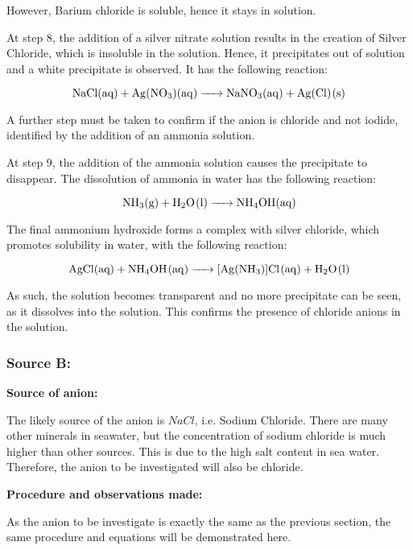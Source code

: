 \documentclass[11pt, a4]{article}
\begin{document}
					However, Barium chloride is soluble, hence it stays in solution. 

					At step 8, the addition of a silver nitrate solution results in the creation of Silver Chloride, which is insoluble in the solution. Hence, it precipitates out of solution and a white precipitate is observed. It has the following reaction:

					\begin{equation}
						\ce{NaCl{(aq)} + Ag(NO_3)(aq) -> NaNO3(aq) + Ag(Cl)(s)}
					\end{equation}

					A further step must be taken to confirm if the anion is chloride and not iodide, identified by the addition of an ammonia solution.
					
					At step 9, the addition of the ammonia solution causes the precipitate to disappear. The dissolution of ammonia in water has the following reaction:

					\begin{equation}
						\ce{NH_3{(g)} + H_2O(l) -> NH_4OH{(aq)}}
					\end{equation}

					The final ammonium hydroxide forms a complex with silver chloride, which promotes solubility in water, with the following reaction:

					\begin{equation}
						\ce{AgCl{(aq)} + NH_4OH(aq) -> [Ag(NH_3)]Cl(aq) + H_2O(l)}
					\end{equation}
					
					As such, the solution becomes transparent and no more precipitate can be seen, as it dissolves into the solution. This confirms the presence of chloride anions in the solution.


				\subsubsection{Source B:}

				\textbf{Source of anion:}

					The likely source of the anion is $NaCl$, i.e. Sodium Chloride. There are many other minerals in seawater, but the concentration of sodium chloride is much higher than other sources. This is due to the high salt content in sea water. Therefore, the anion to be investigated will also be chloride.

				\noindent \textbf{Procedure and observations made:}

					As the anion to be investigate is exactly the same as the previous section, the same procedure and equations will be demonstrated here.
					
\end{document}
